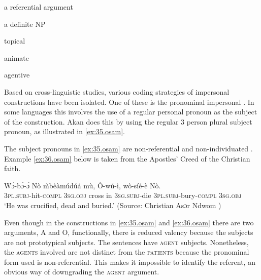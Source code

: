 \documentclass[output=paper]{langsci/langscibook}
\begin{document}
\indent a referential argument

\indent a definite NP

\indent topical

\indent animate

\indent agentive

Based on cross-linguistic studies, various coding strategies of impersonal constructions have been isolated. One of these is the pronominal impersonal \citep{siewierska2011}. In some languages this involves the use of a regular personal pronoun as the subject of the construction. Akan does this by using the regular 3 person plural subject pronoun, as illustrated in \ref{ex:35.osam}.

\ea
\label{ex:35.osam}
	\z

	\z
\z



The subject pronouns in \ref{ex:35.osam} are non-referential and non-individuated \citep{hopperthompson1980}. Example \ref{ex:36.osam} below is taken from the Apostles' Creed of the Christian faith. 

\ea
\label{ex:36.osam}
\gll Wɔ̀-bɔ́-ɔ̀       Nò    \`{m}bèàmúdúá  mù, Ò-wú-ì,     wò-síé-è     Nò.\\
     \textsc{3pl.subj}-hit\textsc{-compl}  \textsc{3sg.obj}  cross in \textsc{3sg.subj}-die  \textsc{3pl.subj}-bury\textsc{-compl}  \textsc{3sg.obj}\\
\glt `He was crucified, dead and buried.' (Source: Christian Asɔr Ndwom \citep{methodist1937})
\z

Even though in the constructions in \ref{ex:35.osam} and \ref{ex:36.osam} there are two arguments, A and O, functionally, there is reduced valency because the subjects are not prototypical subjects. The sentences have \textsc{agent} subjects. Nonetheless, the \textsc{agents} involved are not distinct from the \textsc{patients} because the pronominal form used is non-referential. This makes it impossible to identify the referent, an obvious way of downgrading the \textsc{agent} argument.
\end{document}
